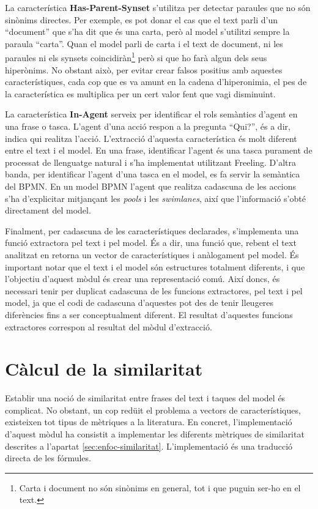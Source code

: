 La característica \textbf{Has-Parent-Synset} s'utilitza per detectar paraules que no són sinònims directes. Per exemple, es pot donar el cas que el text parli d'un ``document'' que s'ha dit que és una carta, però al model s'utilitzi sempre la paraula ``carta''. Quan el model parli de carta i el text de document, ni les paraules ni els synsets coincidiràn\footnote{Carta i document no són sinònims en general, tot i que puguin ser-ho en el text.} però si que ho farà algun dels seus hiperònims. No obstant això, per evitar crear falsos positius amb aquestes característiques, cada cop que es va amunt en la cadena d'hiperonimia, el pes de la característica es multiplica per un cert valor fent que vagi disminuint.

La característica \textbf{In-Agent} serveix per identificar el rols semàntics d'agent en una frase o tasca. L'agent d'una acció respon a la pregunta ``Qui?'', és a dir, indica qui realitza l'acció. L'extracció d'aquesta característica és molt diferent entre el text i el model. En una frase, identificar l'agent és una tasca purament de processat de llenguatge natural i s'ha implementat utilitzant Freeling. D'altra banda, per identificar l'agent d'una tasca en el model, es fa servir la semàntica del BPMN. En un model BPMN l'agent que realitza cadascuna de les accions s'ha d'explicitar mitjançant les \emph{pools} i les \emph{swimlanes}, així que l'informació s'obté directament del model.

Finalment, per cadascuna de les característiques declarades, s'implementa una funció extractora pel text i pel model. És a dir, una funció que, rebent el text analitzat en retorna un vector de característiques i anàlogament pel model. És important notar que el text i el model són estructures totalment diferents, i que l'objectiu d'aquest mòdul és crear una representació comú. Així doncs, és necessari tenir per duplicat cadascuna de les funcions extractores, pel text i pel model, ja que el codi de cadascuna d'aquestes pot des de tenir lleugeres diferències fins a ser conceptualment diferent. El resultat d'aquestes funcions extractores correspon al resultat del mòdul d'extracció.

\section{Càlcul de la similaritat}
\label{sec:implementacio-similaritat}

Establir una noció de similaritat entre frases del text i taques del model és complicat. No obstant, un cop redüit el problema a vectors de característiques, existeixen tot tipus de mètriques a la literatura. En concret, l'implementació d'aquest mòdul ha consistit a implementar les diferents mètriques de similaritat descrites a l'apartat \ref{sec:enfoc-similaritat}. L'implementació és una traducció directa de les fórmules.

